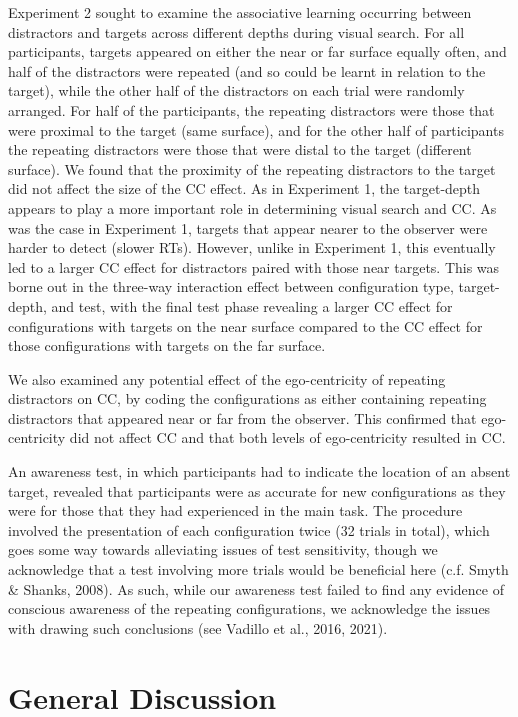 \documentclass[
  english,
  man,floatsintext]{apa7}
\begin{document}
Experiment 2 sought to examine the associative learning occurring between distractors and targets across different depths during visual search. For all participants, targets appeared on either the near or far surface equally often, and half of the distractors were repeated (and so could be learnt in relation to the target), while the other half of the distractors on each trial were randomly arranged. For half of the participants, the repeating distractors were those that were proximal to the target (same surface), and for the other half of participants the repeating distractors were those that were distal to the target (different surface). We found that the proximity of the repeating distractors to the target did not affect the size of the CC effect. As in Experiment 1, the target-depth appears to play a more important role in determining visual search and CC. As was the case in Experiment 1, targets that appear nearer to the observer were harder to detect (slower RTs). However, unlike in Experiment 1, this eventually led to a larger CC effect for distractors paired with those near targets. This was borne out in the three-way interaction effect between configuration type, target-depth, and test, with the final test phase revealing a larger CC effect for configurations with targets on the near surface compared to the CC effect for those configurations with targets on the far surface.

We also examined any potential effect of the ego-centricity of repeating distractors on CC, by coding the configurations as either containing repeating distractors that appeared near or far from the observer. This confirmed that ego-centricity did not affect CC and that both levels of ego-centricity resulted in CC.

An awareness test, in which participants had to indicate the location of an absent target, revealed that participants were as accurate for new configurations as they were for those that they had experienced in the main task. The procedure involved the presentation of each configuration twice (32 trials in total), which goes some way towards alleviating issues of test sensitivity, though we acknowledge that a test involving more trials would be beneficial here (c.f. Smyth \& Shanks, 2008). As such, while our awareness test failed to find any evidence of conscious awareness of the repeating configurations, we acknowledge the issues with drawing such conclusions (see Vadillo et al., 2016, 2021).

\hypertarget{general-discussion}{%
\section{General Discussion}\label{general-discussion}}
\end{document}
